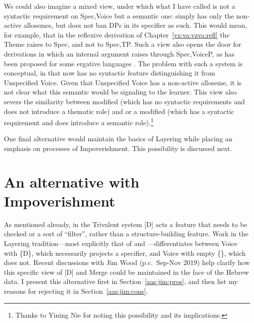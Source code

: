 We could also imagine a mixed view, under which what I have called {\vz} is not a syntactic requirement on Spec,Voice but a semantic one: {\vz} simply has only the non-active allosemes, but does not ban DPs in its specifier as such. This would mean, for example, that in the reflexive derivation of Chapter~\ref{vz:va:vzva:refl} the Theme raises to Spec,{\vz} and not to Spec,TP. Such a view also opens the door for derivations in which an internal argument raises through Spec,VoiceP, as has been proposed for some ergative languages \citep{deal19li}. The problem with such a system is conceptual, in that {\vz} now has no syntactic feature distinguishing it from Unspecified Voice. Given that Unspecified Voice has a non-active alloseme, it is not clear what this semantic {\vz} would be signaling to the learner. This view also severs the similarity between modified {\vz} (which has no syntactic requirements and does not introduce a thematic role) and {\pz} or a modified {\pz} (which has a syntactic requirement and does introduce a semantic role).\footnote{Thanks to Yining Nie for noting this possibility and its implications.}

One final alternative would maintain the basics of Layering while placing an emphasis on processes of Impoverishment. This possibility is discussed next.

\section{An alternative with Impoverishment} \label{aas:jim}

\label{r1:g:2c2}As mentioned already, in the Trivalent system [D] acts a feature that needs to be checked or a sort of ``filter'', rather than a structure-building feature. Work in the Layering tradition---most explicitly that of \cite{schaefer08} and \cite{wood15springer}---differentiates between Voice with \{D\}, which necessarily projects a specifier, and Voice with empty \{\}, which does not. Recent discussions with Jim Wood (p.c.~Sep-Nov 2019) help clarify how this specific view of [D] and Merge could be maintained in the face of the Hebrew data. I present this alternative first in Section~\ref{aas:jim:pros}, and then list my reasons for rejecting it in Section~\ref{aas:jim:cons}.

